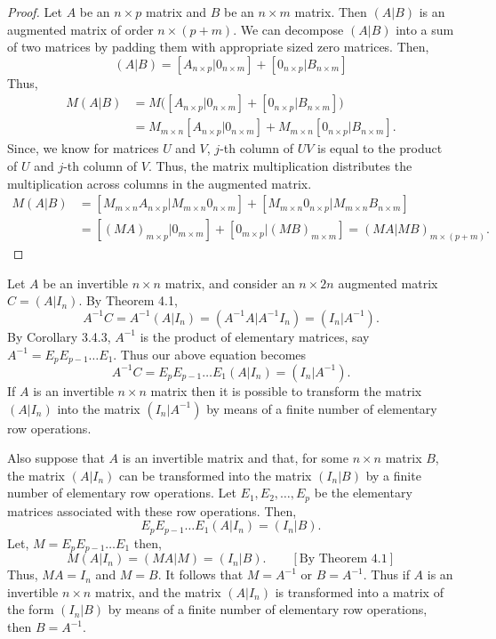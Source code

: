 \documentclass[12pt, a4paper]{article}
\theoremstyle{definition}
\theoremstyle{remark}
\begin{document}
\begin{proof}
Let $A$ be an $n \times p$ matrix and $B$ be an $n \times m$ matrix. Then $(A|B)$ is an augmented matrix of order $n \times (p+m)$. We can decompose $(A|B)$ into a sum of two matrices by padding them with appropriate sized zero matrices. Then,
\[
(A|B) = [A_{n \times p} | 0_{n \times m}] + [0_{n \times p} | B_{n \times m}]
\]
Thus,
\begin{align*}
M(A|B) &= M\Big([A_{n \times p} | 0_{n \times m}] + [0_{n \times p} | B_{n \times m}]\Big) \\
&= M_{m \times n}[A_{n \times p} | 0_{n \times m}] + M_{m \times n}[0_{n \times p} | B_{n \times m}].
\end{align*}
Since, we know for matrices $U$ and $V$, $j$-th column of $UV$ is equal to the product of $U$ and $j$-th column of $V$. Thus, the matrix multiplication distributes the multiplication across columns in the augmented matrix.
\begin{align*}
M(A|B) &= [M_{m \times n} A_{n \times p} | M_{m \times n} 0_{n \times m}] + [M_{m \times n} 0_{n \times p} | M_{m \times n} B_{n \times m}] \\
&= [(MA)_{m \times p} | 0_{m \times m}] + [0_{m \times p} | (MB)_{m \times m}] = (MA|MB)_{m \times (p+m)}.
\end{align*}
\end{proof}

Let $A$ be an invertible $n \times n$ matrix, and consider an $n \times 2n$ augmented matrix $C = (A | I_n)$. By Theorem 4.1,
\[
A^{-1}C = A^{-1}(A | I_n) = (A^{-1}A | A^{-1}I_n) = (I_n | A^{-1}).
\]
By Corollary 3.4.3, $A^{-1}$ is the product of elementary matrices, say $A^{-1} = E_p E_{p-1} \dots E_1$. Thus our above equation becomes
\[
A^{-1}C = E_p E_{p-1} \dots E_1 (A | I_n) = (I_n | A^{-1}).
\]
If $A$ is an invertible $n \times n$ matrix then it is possible to transform the matrix $(A | I_n)$ into the matrix $(I_n | A^{-1})$ by means of a finite number of elementary row operations.

Also suppose that $A$ is an invertible matrix and that, for some $n \times n$ matrix $B$, the matrix $(A | I_n)$ can be transformed into the matrix $(I_n | B)$ by a finite number of elementary row operations. Let $E_1, E_2, \dots, E_p$ be the elementary matrices associated with these row operations. Then,
\[
E_p E_{p-1} \dots E_1 (A | I_n) = (I_n | B).
\]
Let, $M = E_p E_{p-1} \dots E_1$ then,
\[
M(A | I_n) = (MA | M) = (I_n | B). \qquad [\text{By Theorem 4.1}]
\]
Thus, $MA = I_n$ and $M = B$. It follows that $M = A^{-1}$ or $B = A^{-1}$. Thus if $A$ is an invertible $n \times n$ matrix, and the matrix $(A | I_n)$ is transformed into a matrix of the form $(I_n | B)$ by means of a finite number of elementary row operations, then $B = A^{-1}$.
\end{document}
